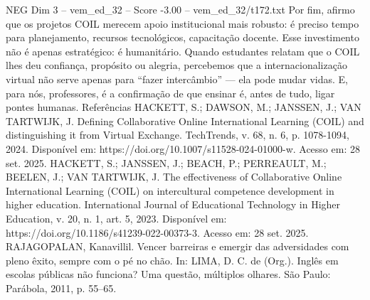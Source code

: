 \begin{textsample}{NEG Dim 3 – vem\_ed\_32 – Score -3.00 – vem\_ed\_32/t172.txt}
Por fim, afirmo que os projetos COIL merecem apoio institucional mais robusto: é preciso tempo para planejamento, recursos tecnológicos, capacitação docente.
Esse investimento não é apenas estratégico: é humanitário.
Quando estudantes relatam que o COIL lhes deu confiança, propósito ou alegria, percebemos que a internacionalização virtual não serve apenas para “fazer intercâmbio” — ela pode mudar vidas.
E, para nós, professores, é a confirmação de que ensinar é, antes de tudo, ligar pontes humanas.
Referências HACKETT, S.; DAWSON, M.; JANSSEN, J.; VAN TARTWIJK, J.
Defining Collaborative Online International Learning (COIL) and distinguishing it from Virtual Exchange.
TechTrends, v. 68, n. 6, p. 1078-1094, 2024.
Disponível em: https://doi.org/10.1007/s11528-024-01000-w.
Acesso em: 28 set. 2025.
HACKETT, S.; JANSSEN, J.; BEACH, P.; PERREAULT, M.; BEELEN, J.; VAN TARTWIJK, J.
The effectiveness of Collaborative Online International Learning (COIL) on intercultural competence development in higher education.
International Journal of Educational Technology in Higher Education, v. 20, n. 1, art. 5, 2023.
Disponível em: https://doi.org/10.1186/s41239-022-00373-3.
Acesso em: 28 set. 2025.
RAJAGOPALAN, Kanavillil.
Vencer barreiras e emergir das adversidades com pleno êxito, sempre com o pé no chão.
In: LIMA, D.
C. de (Org.).
Inglês em escolas públicas não funciona?
Uma questão, múltiplos olhares.
São Paulo: Parábola, 2011, p. 55–65.

\end{textsample}

